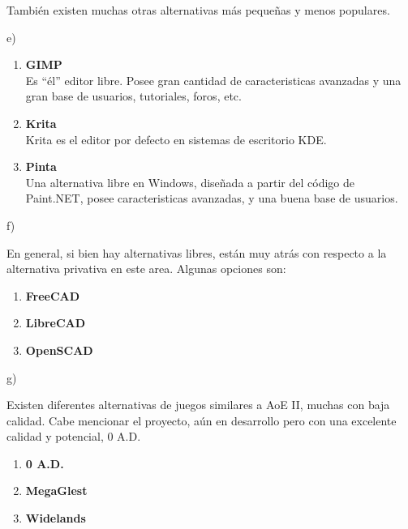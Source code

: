 También existen muchas otras alternativas más pequeñas y menos populares.

\noindent e)

\begin{enumerate}
    \item \textbf{GIMP}\\
        Es ``él'' editor libre. Posee gran cantidad de caracteristicas avanzadas
        y una gran base de usuarios, tutoriales, foros, etc.
    \item \textbf{Krita}\\
        Krita es el editor por defecto en sistemas de escritorio KDE.
    \item \textbf{Pinta}\\
        Una alternativa libre en Windows, diseñada a partir del código de Paint.NET,
        posee caracteristicas avanzadas, y una buena base de usuarios.
\end{enumerate}

\noindent f)

En general, si bien hay alternativas libres, están muy atrás con respecto a
la alternativa privativa en este area. Algunas opciones son:
\begin{enumerate}
    \item \textbf{FreeCAD}
    \item \textbf{LibreCAD}
    \item \textbf{OpenSCAD}
\end{enumerate}

\noindent g)

Existen diferentes alternativas de juegos similares a AoE II, muchas con baja
calidad. Cabe mencionar el proyecto, aún en desarrollo pero con una excelente
calidad y potencial, 0 A.D.
\begin{enumerate}
    \item \textbf{0 A.D.}
    \item \textbf{MegaGlest}
    \item \textbf{Widelands}
\end{enumerate}